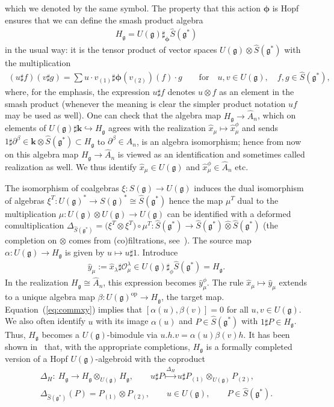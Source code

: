 \documentclass[10pt,a4paper]{amsart}
\def\op{\mathrm{op}}
\def\genfd{\mathbf{k}}
\def\gg{\mathfrak{g}}
\def\hx{\hat{x}}
\def\hy{\hat{y}}
\numberwithin{equation}{section}
\begin{document}
which we denoted by the same symbol. The property that this action ${\boldsymbol \phi}$ is Hopf ensures that we can define the smash product algebra
\begin{gather*}
H_\gg = U(\gg)\sharp_{{\boldsymbol \phi}}\hat{S}(\gg^*)
\end{gather*}
in the usual way: it is the tensor product of vector spaces $U(\gg)\otimes\hat{S}(\gg^*)$ with the multiplication
\begin{gather*}(u\sharp f) (v\sharp g) = \sum u\cdot v_{(1)}\sharp {\boldsymbol \phi}(v_{(2)})(f)\cdot g\qquad \text{for}\quad u,v\in U(\gg),\quad f,g\in\hat{S}(\gg^*),\end{gather*}
where, for the emphasis, the expression $u\sharp f$ denotes $u\otimes f$ as an element in the smash product (whenever the meaning is clear the simpler product notation $u f$ may be used as well). One can check that the algebra map $H_\gg\to\hat{A}_n$, which on elements of $U(\gg)\sharp\genfd \hookrightarrow H_\gg$ agrees with the realization $\hat{x}_\mu\mapsto\hat{x}^\phi_\mu$ and sends $1\sharp\partial^\beta\in \genfd\otimes\hat{S}(\gg^*)\subset H_\gg$ to $\partial^\beta\in A_n$, is an algebra isomorphism; hence from now on this algebra map $H_\gg\to\hat{A}_n$ is viewed as an identification and sometimes called realization as well. We thus identify $\hat{x}_\mu\in U(\gg)$ and $\hat{x}^\phi_\mu\in \hat{A}_n$ etc.

The isomorphism of coalgebras $\xi\colon S(\gg)\to U(\gg)$ induces the dual isomorphism of algebras $\xi^T\colon U(\gg)^*\to S(\gg)^*\cong \hat{S}(\gg^*)$ hence the map $\mu^T$ dual to the multiplication $\mu\colon U(\gg)\otimes U(\gg)\to U(\gg)$ can be identified with a deformed comultiplication $\Delta_{\hat{S}(\gg^*)} = \big(\xi^T\otimes\xi^T\big)\circ\mu^T\colon \hat{S}(\gg^*) \to\hat{S}(\gg^*)\hat\otimes\hat{S}(\gg^*)$ (the completion on $\otimes$ comes from (co)filtrations, see~\cite{halg}). The source map $\alpha\colon U(\gg)\to H_\gg$ is given by $u\mapsto u\sharp 1$. Introduce
\begin{gather*}
\hy_\mu := \hx_\lambda\sharp\mathcal{O}^\lambda_\mu\in U(\gg)\sharp_\phi\hat{S}(\gg^*) = H_\gg.
\end{gather*}
In the realization $H_\gg\cong\hat{A}_n$, this expression becomes $\hy_\mu^\phi$. The rule $\hx_\mu\mapsto\hy_\mu$ extends to a unique algebra map $\beta\colon U(\gg)^\op\to H_\gg$, the target map. Equation~(\ref{eq:commxy}) implies that $[\alpha(u),\beta(v)] = 0$ for all $u,v\in U(\gg)$. We also often identify $u$ with its image $\alpha(u)$ and $P\in\hat{S}(\gg^*)$ with $1\sharp P\in H_\gg$. Thus, $H_\gg$ becomes a $U(\gg)$-bimodule via $u.h.v = \alpha(u)\beta(v)h$. It has been shown in~\cite{halg} that, with the appropriate completions, $H_\gg$ is a formally completed version of a Hopf $U(\gg)$-algebroid with the coproduct
\begin{gather*}
\Delta_H \colon \ H_\gg\to H_\gg\hat\otimes_{U(\gg)}H_\gg,\qquad
u\sharp P\stackrel{\Delta_H}\mapsto u \sharp P_{(1)}\otimes_{U(\gg)} P_{(2)},\\
\Delta_{\hat{S}(\gg^*)}(P) = P_{(1)}\otimes P_{(2)},\qquad u\in U(\gg), \qquad P\in\hat{S}(\gg^*).
\end{gather*}
\end{document}
